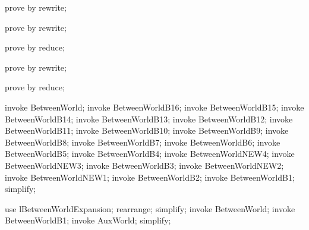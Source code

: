 \begin{LDCheck}\begin{zproof}
   prove by rewrite;
\end{zproof}\end{LDCheck}

\begin{LDCheck}\begin{zproof}
   prove by rewrite;
\end{zproof}\end{LDCheck}

\begin{LDCheck}\begin{zproof}
   prove by reduce;
\end{zproof}\end{LDCheck}

\begin{LDCheck}\begin{zproof}
   prove by rewrite;
\end{zproof}\end{LDCheck}

\begin{LDCheck}\begin{zproof}
   prove by reduce;
\end{zproof}\end{LDCheck}

\begin{LPScript}\begin{zproof}[lBetweenWorldExpansion]
    invoke BetweenWorld;
    invoke BetweenWorldB16;
    invoke BetweenWorldB15;
    invoke BetweenWorldB14;
    invoke BetweenWorldB13;
    invoke BetweenWorldB12;
    invoke BetweenWorldB11;
    invoke BetweenWorldB10;
    invoke BetweenWorldB9;
    invoke BetweenWorldB8;
    invoke BetweenWorldB7;
    invoke BetweenWorldB6;
    invoke BetweenWorldB5;
    invoke BetweenWorldB4;
    invoke BetweenWorldNEW4;
    invoke BetweenWorldNEW3;
    invoke BetweenWorldB3;
    invoke BetweenWorldNEW2;
    invoke BetweenWorldNEW1;
    invoke BetweenWorldB2;
    invoke BetweenWorldB1;
    simplify;
\end{zproof}\end{LPScript}

\begin{LPScript}\begin{zproof}[lBetweenWorldAuxWorldExpansion]
    use lBetweenWorldExpansion;
    rearrange;
    simplify;
    invoke BetweenWorld;
    invoke BetweenWorldB1;
    invoke AuxWorld;
    simplify;
\end{zproof}\end{LPScript}


